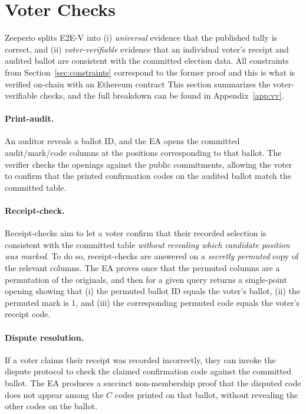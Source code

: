 \section{Voter Checks}
\label{sec:voter}
Zeeperio splits E2E-V into (i) \emph{universal} evidence that the
published tally is correct, and (ii) \emph{voter-verifiable} evidence that an individual voter’s receipt
and audited ballot are consistent with the committed election data.
All constraints from Section~\ref{sec:constraints} correspond to the former proof and this is what is verified on-chain with an Ethereum contract
This section summarizes the voter-verifiable checks, and the full breakdown can be found in Appendix~\ref{app:vv}.

\paragraph{Print-audit.}
An auditor reveals a ballot ID, and the EA opens the committed
audit/mark/code columns at the positions corresponding to that ballot.
The verifier checks the openings against the public commitments, allowing the voter to confirm
that the printed confirmation codes on the audited ballot match the committed table.

\paragraph{Receipt-check.}
Receipt-checks aim to let a voter confirm that their recorded selection is consistent with the committed
table \emph{without revealing which candidate position was marked}.
To do so, receipt-checks are answered on a \emph{secretly permuted} copy of the relevant columns.
The EA proves once that the permuted columns are a permutation of the originals, and then for a given
query returns a single-point opening showing that (i) the permuted ballot ID equals the voter’s ballot,
(ii) the permuted mark is $1$, and (iii) the corresponding permuted code equals the voter’s receipt code.

\paragraph{Dispute resolution.}
If a voter claims their receipt was recorded incorrectly, they can invoke the dispute protocol to check the
claimed confirmation code against the committed ballot.
The EA produces a succinct non-membership proof that the disputed code does not appear among the $C$
codes printed on that ballot, without revealing the other codes on the ballot.


